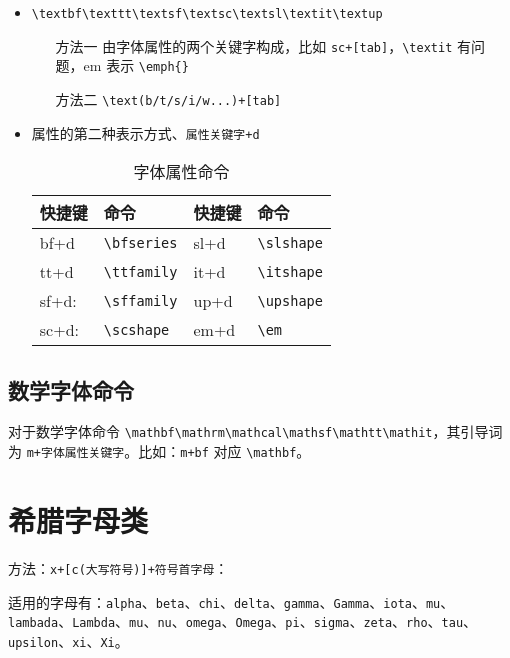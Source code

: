 \documentclass[blue,cn,normal,11pt]{elegantnote}
\begin{document}
\begin{itemize}
\item \lstinline|\textbf\texttt\textsf\textsc\textsl\textit\textup|
\begin{itemize}
\item[方法一] 由字体属性的两个关键字构成，比如 \lstinline{sc+[tab]}，\lstinline{\textit} 有问题，em 表示 \lstinline|\emph{}|
\item[方法二] \lstinline{\text(b/t/s/i/w...)+[tab]}
\end{itemize}
\item 属性的第二种表示方式、\lstinline{属性关键字+d}
\begin{table}[htbp]
  \centering
  \caption{字体属性命令}
    \begin{tabular}{llll}
    \toprule
    快捷键   & 命令    & 快捷键 & 命令 \\
    \midrule
    bf+d   & \lstinline|\bfseries| & sl+d & \lstinline|\slshape| \\
    tt+d & \lstinline|\ttfamily| & it+d & \lstinline|\itshape| \\
    sf+d:  & \lstinline|\sffamily| & up+d & \lstinline|\upshape| \\
    sc+d:  & \lstinline|\scshape| & em+d & \lstinline|\em| \\
    \bottomrule
    \end{tabular}%
  \label{tab:greek}%
\end{table}%
\end{itemize}

\subsection{数学字体命令}

对于数学字体命令 \lstinline{\mathbf\mathrm\mathcal\mathsf\mathtt\mathit}，其引导词为 \lstinline{m+字体属性关键字}。比如：\lstinline{m+bf} 对应 \lstinline{\mathbf}。
    
\section{希腊字母类}
方法：\lstinline|x+[c(大写符号)]+符号首字母|：

适用的字母有：\lstinline|alpha|、\lstinline|beta|、\lstinline|chi|、\lstinline|delta|、\lstinline|gamma|、\lstinline|Gamma|、\lstinline|iota|、\lstinline|mu|、\lstinline|lambada|、\lstinline|Lambda|、\lstinline|mu|、\lstinline|nu|、\lstinline|omega|、\lstinline|Omega|、\lstinline|pi|、\lstinline|sigma|、\lstinline|zeta|、\lstinline|rho|、\lstinline|tau|、\lstinline|upsilon|、\lstinline|xi|、\lstinline|Xi|。
\end{document}
